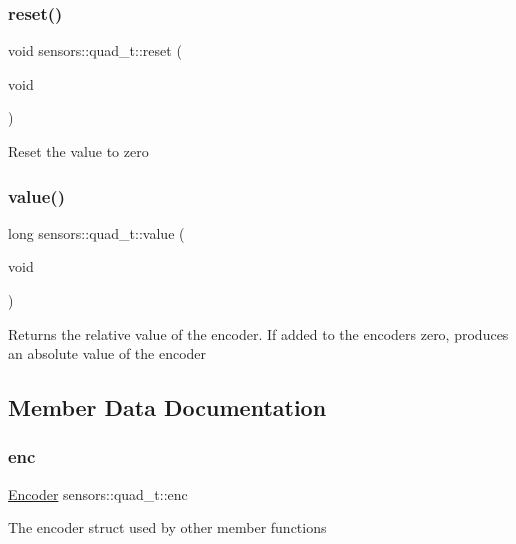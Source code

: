 \subsubsection{\texorpdfstring{reset()}{reset()}}
{\footnotesize\ttfamily void sensors\+::quad\+\_\+t\+::reset (\begin{DoxyParamCaption}\item[{void}]{ }\end{DoxyParamCaption})}

Reset the value to zero \mbox{\label{structsensors_1_1quad__t_a5d05cb2d530870f1108c4181715f7006}} 
\subsubsection{\texorpdfstring{value()}{value()}}
{\footnotesize\ttfamily long sensors\+::quad\+\_\+t\+::value (\begin{DoxyParamCaption}\item[{void}]{ }\end{DoxyParamCaption})}

Returns the relative value of the encoder. If added to the encoder\textquotesingle{}s zero, produces an absolute value of the encoder 

\subsection{Member Data Documentation}
\mbox{\label{structsensors_1_1quad__t_ab6355ae9a56dea947376ccfd2b3b9da8}} 
\subsubsection{\texorpdfstring{enc}{enc}}
{\footnotesize\ttfamily \hyperlink{API_8h_a8289b20280bf9db1462f60dae76d2939}{Encoder} sensors\+::quad\+\_\+t\+::enc}

The encoder struct used by other member functions \mbox{\label{structsensors_1_1quad__t_a7c95cf6e860fa651b3dc23535d5e1407}} 
